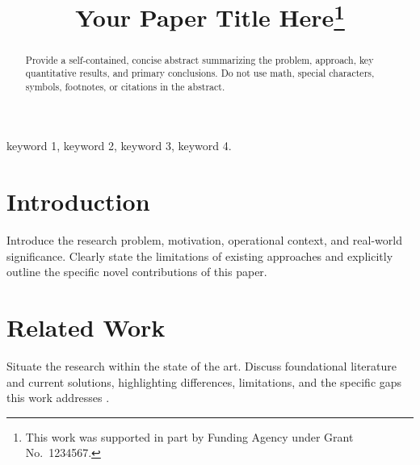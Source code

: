 \documentclass[conference]{IEEEtran}
\begin{document}
\title{Your Paper Title Here\thanks{This work was supported in part by Funding Agency under Grant No.~1234567.}}

\author{
\and
{}
}


\maketitle

\begin{abstract}
Provide a self-contained, concise abstract summarizing the problem, approach, key quantitative results, and primary conclusions. Do not use math, special characters, symbols, footnotes, or citations in the abstract.
\end{abstract}

\begin{IEEEkeywords}
keyword 1, keyword 2, keyword 3, keyword 4.
\end{IEEEkeywords}

\section{Introduction}
Introduce the research problem, motivation, operational context, and real-world significance. Clearly state the limitations of existing approaches and explicitly outline the specific novel contributions of this paper.

\section{Related Work}
Situate the research within the state of the art. Discuss foundational literature and current solutions, highlighting differences, limitations, and the specific gaps this work addresses \cite{ref_article, ref_conf}.
\end{document}

